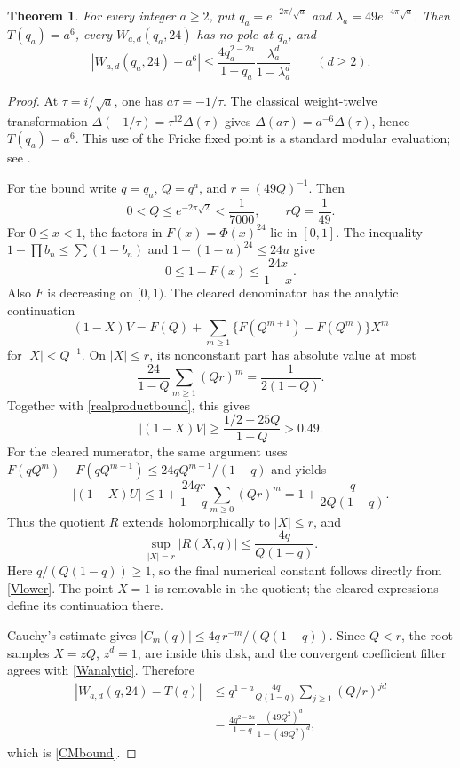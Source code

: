 \documentclass[11pt]{amsart}
\newtheorem{theorem}{Theorem}[section]
\theoremstyle{definition}
\theoremstyle{remark}
\numberwithin{equation}{section}
\begin{document}
\begin{theorem}\label{CMtheorem}
For every integer $a\ge2$, put $q_a=e^{-2\pi/\sqrt a}$ and $\lambda_a=49e^{-4\pi\sqrt a}$. Then $T(q_a)=a^6$, every $W_{a,d}(q_a,24)$ has no pole at $q_a$, and
\begin{equation}\label{CMbound}
 \left|W_{a,d}(q_a,24)-a^6\right|
 \le\frac{4q_a^{2-2a}}{1-q_a}
        \frac{\lambda_a^d}{1-\lambda_a^d}
 \qquad(d\ge2).
\end{equation}
\end{theorem}
\begin{proof}
At $\tau=i/\sqrt a$, one has $a\tau=-1/\tau$. The classical weight-twelve transformation
$\Delta(-1/\tau)=\tau^{12}\Delta(\tau)$ gives
$\Delta(a\tau)=a^{-6}\Delta(\tau)$, hence $T(q_a)=a^6$. This use of the Fricke fixed point is a standard modular evaluation; see \cite{Serre,Zagier}.

For the bound write $q=q_a$, $Q=q^a$, and $r=(49Q)^{-1}$. Then
\[
 0<Q\le e^{-2\pi\sqrt2}<\frac1{7000},\qquad rQ=\frac1{49}.
\]
For $0\le x<1$, the factors in $F(x)=\Phi(x)^{24}$ lie in $[0,1]$. The inequality $1-\prod b_n\le\sum(1-b_n)$ and $1-(1-u)^{24}\le24u$ give
\begin{equation}\label{realproductbound}
 0\le1-F(x)\le\frac{24x}{1-x}.
\end{equation}
Also $F$ is decreasing on $[0,1)$. The cleared denominator has the analytic continuation
\[
 (1-X)V=F(Q)+\sum_{m\ge1}\{F(Q^{m+1})-F(Q^m)\}X^m
\]
for $|X|<Q^{-1}$. On $|X|\le r$, its nonconstant part has absolute value at most
\[
 \frac{24}{1-Q}\sum_{m\ge1}(Qr)^m=\frac1{2(1-Q)}.
\]
Together with \eqref{realproductbound}, this gives
\begin{equation}\label{Vlower}
 |(1-X)V|\ge\frac{1/2-25Q}{1-Q}>0.49.
\end{equation}
For the cleared numerator, the same argument uses
$F(qQ^m)-F(qQ^{m-1})\le24qQ^{m-1}/(1-q)$ and yields
\[
 |(1-X)U|\le1+\frac{24qr}{1-q}\sum_{m\ge0}(Qr)^m
            =1+\frac{q}{2Q(1-q)}.
\]
Thus the quotient $R$ extends holomorphically to $|X|\le r$, and
\begin{equation}\label{Rbound}
 \sup_{|X|=r}|R(X,q)|\le\frac{4q}{Q(1-q)}.
\end{equation}
Here $q/(Q(1-q))\ge1$, so the final numerical constant follows directly from \eqref{Vlower}. The point $X=1$ is removable in the quotient; the cleared expressions define its continuation there.

Cauchy's estimate gives $|C_m(q)|\le4q\,r^{-m}/(Q(1-q))$. Since $Q<r$, the root samples $X=zQ$, $z^d=1$, are inside this disk, and the convergent coefficient filter agrees with \eqref{Wanalytic}. Therefore
\begin{align*}
 |W_{a,d}(q,24)-T(q)|
 &\le q^{1-a}\frac{4q}{Q(1-q)}
                  \sum_{j\ge1}(Q/r)^{jd}\\
 &=\frac{4q^{2-2a}}{1-q}
                  \frac{(49Q^2)^d}{1-(49Q^2)^d},
\end{align*}
which is \eqref{CMbound}.
\end{proof}
\end{document}
